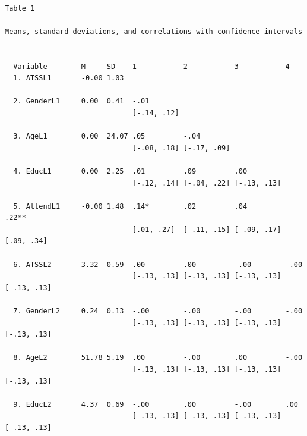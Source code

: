\documentclass[
  english,
]{book}
\begin{document}
\begin{verbatim}

Table 1 

Means, standard deviations, and correlations with confidence intervals
 

  Variable        M     SD    1           2           3           4          
  1. ATSSL1       -0.00 1.03                                                 
                                                                             
  2. GenderL1     0.00  0.41  -.01                                           
                              [-.14, .12]                                    
                                                                             
  3. AgeL1        0.00  24.07 .05         -.04                               
                              [-.08, .18] [-.17, .09]                        
                                                                             
  4. EducL1       0.00  2.25  .01         .09         .00                    
                              [-.12, .14] [-.04, .22] [-.13, .13]            
                                                                             
  5. AttendL1     -0.00 1.48  .14*        .02         .04         .22**      
                              [.01, .27]  [-.11, .15] [-.09, .17] [.09, .34] 
                                                                             
  6. ATSSL2       3.32  0.59  .00         .00         -.00        -.00       
                              [-.13, .13] [-.13, .13] [-.13, .13] [-.13, .13]
                                                                             
  7. GenderL2     0.24  0.13  -.00        -.00        -.00        -.00       
                              [-.13, .13] [-.13, .13] [-.13, .13] [-.13, .13]
                                                                             
  8. AgeL2        51.78 5.19  .00         -.00        .00         -.00       
                              [-.13, .13] [-.13, .13] [-.13, .13] [-.13, .13]
                                                                             
  9. EducL2       4.37  0.69  -.00        .00         -.00        .00        
                              [-.13, .13] [-.13, .13] [-.13, .13] [-.13, .13]
                                                                             

\end{verbatim}
\end{document}
